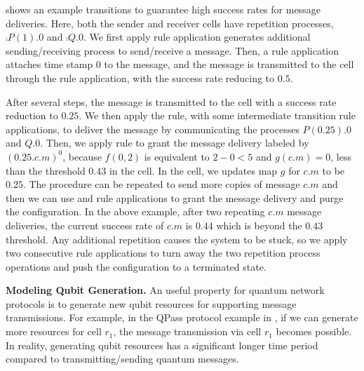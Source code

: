  shows an example transitions to guarantee high success rates for message deliveries.
Here, both the sender and receiver cells have repetition processes, 
$\comp{P(1).0}$ and $\comp{Q.0}$.
We first apply  rule application generates additional sending/receiving process to send/receive a message.
Then, a  rule application attaches time stamp $0$ to the message,
and the message is transmitted to the  cell through the  rule application,
with the success rate reducing to $0.5$.

After several steps, the message is transmitted to the  cell with a success rate reduction to $0.25$.
We then apply the  rule, with some intermediate transition rule applications, 
to deliver the message by communicating the processes $P(0.25).0$ and $Q.0$.
Then, we apply rule  to grant the message delivery labeled by $(0.25.c.m)^0$, because $f(0,2)$ is equivalent to $2-0<5$ and $g(c.m)=0$, less than the threshold $0.43$ in the  cell.
In the  cell, we updates map $g$ for $c.m$ to be $0.25$.
The procedure can be repeated to send more copies of message $c.m$ and then we can use  and  rule applications to grant the message delivery and purge the configuration. 
In the above example, after two repeating $c.m$ message deliveries, the current success rate of $c.m$ is $0.44$ which is beyond the $0.43$ threshold. Any additional repetition causes the system to be stuck, so we apply two consecutive  rule applications to turn away the two repetition process operations and push the configuration to a terminated state.

\noindent\textbf{Modeling Qubit Generation.}
An useful property for quantum network protocols is to generate new qubit resources for supporting message transmissions.
For example, in the QPass protocol example in , if we can generate more resources for cell $r_1$, 
the message transmission via cell $r_1$ becomes possible.
In reality, generating qubit resources has a significant longer time period compared to transmitting/sending quantum messages.


